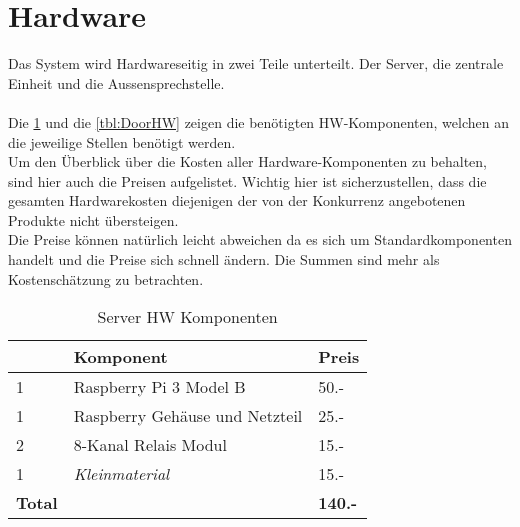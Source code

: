 \section{Hardware}
\label{sec:chapterexample}

Das System wird Hardwareseitig in zwei Teile unterteilt. Der Server, die zentrale Einheit und die Aussensprechstelle.
\\
\\
Die \cref{tbl:SrvHW} und die \cref{tbl:DoorHW} zeigen die benötigten HW-Komponenten, welchen an die jeweilige Stellen benötigt werden.
\\
Um den Überblick über die Kosten aller Hardware-Komponenten zu behalten, sind hier auch die Preisen aufgelistet. Wichtig hier ist sicherzustellen, dass die gesamten Hardwarekosten diejenigen der von der Konkurrenz angebotenen Produkte nicht übersteigen.
\\
Die Preise können natürlich leicht abweichen da es sich um Standardkomponenten handelt und die Preise sich schnell ändern. Die Summen sind mehr als Kostenschätzung zu betrachten.

\begin{table}[]
	\centering
	\label{my-label}
	\begin{tabular}{l|ll}
		\multicolumn{1}{r|}{} \textbf{Anzahl} & \textbf{Komponent} \hspace{180pt} & \textbf{Preis} 	\\ \hline
		1	&	Raspberry Pi 3 Model B						& 50.-				\\ \hline
		1	&	Raspberry Gehäuse und Netzteil				& 25.-			\\ \hline
		2	&	8-Kanal Relais Modul						& 15.-			\\ \hline
		1	&	\textit{Kleinmaterial}						& 15.-			\\ \hline
		\textbf{Total}	&									& \textbf{140.-}			\\ \hline
	\end{tabular}
	\caption{Server HW Komponenten}
	\label{tbl:SrvHW}
\end{table}

